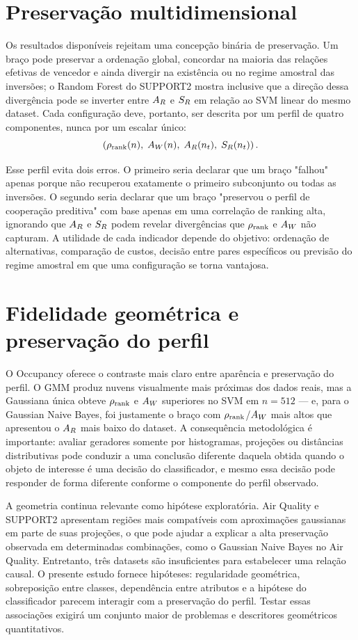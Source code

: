 \section{Preservação multidimensional}

Os resultados disponíveis rejeitam uma concepção binária de preservação. Um braço pode preservar a ordenação global, concordar na maioria das relações efetivas de vencedor e ainda divergir na existência ou no regime amostral das inversões; o Random Forest do SUPPORT2 mostra inclusive que a direção dessa divergência pode se inverter entre $A_R$ e $S_R$ em relação ao SVM linear do mesmo dataset. Cada configuração deve, portanto, ser descrita por um perfil de quatro componentes, nunca por um escalar único:
\[
\left(
  \rho_{\mathrm{rank}}(n),\;
  A_W(n),\;
  A_R(n_t),\;
  S_R(n_t)
\right).
\]

Esse perfil evita dois erros. O primeiro seria declarar que um braço "falhou" apenas porque não recuperou exatamente o primeiro subconjunto ou todas as inversões. O segundo seria declarar que um braço "preservou o perfil de cooperação preditiva" com base apenas em uma correlação de ranking alta, ignorando que $A_R$ e $S_R$ podem revelar divergências que $\rho_{\mathrm{rank}}$ e $A_W$ não capturam. A utilidade de cada indicador depende do objetivo: ordenação de alternativas, comparação de custos, decisão entre pares específicos ou previsão do regime amostral em que uma configuração se torna vantajosa.

\section{Fidelidade geométrica e preservação do perfil}

O Occupancy oferece o contraste mais claro entre aparência e preservação do perfil. O GMM produz nuvens visualmente mais próximas dos dados reais, mas a Gaussiana única obteve $\rho_{\mathrm{rank}}$ e $A_W$ superiores no SVM em $n=512$ --- e, para o Gaussian Naive Bayes, foi justamente o braço com $\rho_{\mathrm{rank}}$/$A_W$ mais altos que apresentou o $A_R$ mais baixo do dataset. A consequência metodológica é importante: avaliar geradores somente por histogramas, projeções ou distâncias distributivas pode conduzir a uma conclusão diferente daquela obtida quando o objeto de interesse é uma decisão do classificador, e mesmo essa decisão pode responder de forma diferente conforme o componente do perfil observado.

A geometria continua relevante como hipótese exploratória. Air Quality e SUPPORT2 apresentam regiões mais compatíveis com aproximações gaussianas em parte de suas projeções, o que pode ajudar a explicar a alta preservação observada em determinadas combinações, como o Gaussian Naive Bayes no Air Quality. Entretanto, três datasets são insuficientes para estabelecer uma relação causal. O presente estudo fornece hipóteses: regularidade geométrica, sobreposição entre classes, dependência entre atributos e a hipótese do classificador parecem interagir com a preservação do perfil. Testar essas associações exigirá um conjunto maior de problemas e descritores geométricos quantitativos.

